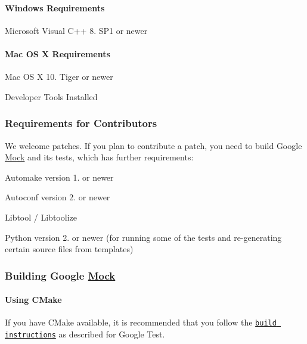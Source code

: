 \paragraph*{Windows Requirements}


\begin{DoxyItemize}
\item Microsoft Visual C++ 8. S\+P1 or newer
\end{DoxyItemize}

\paragraph*{Mac OS X Requirements}


\begin{DoxyItemize}
\item Mac OS X 10. Tiger or newer
\item Developer Tools Installed
\end{DoxyItemize}

\subsubsection*{Requirements for Contributors}

We welcome patches. If you plan to contribute a patch, you need to build Google \hyperlink{classMock}{Mock} and its tests, which has further requirements\+:


\begin{DoxyItemize}
\item Automake version 1. or newer
\item Autoconf version 2. or newer
\item Libtool / Libtoolize
\item Python version 2. or newer (for running some of the tests and re-\/generating certain source files from templates)
\end{DoxyItemize}

\subsubsection*{Building Google \hyperlink{classMock}{Mock}}

\paragraph*{Using C\+Make}

If you have C\+Make available, it is recommended that you follow the \href{../googletest/README.md#using-cmake}{\tt build instructions} as described for Google Test.

